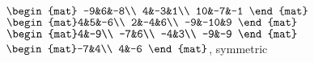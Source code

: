 \begin{Answer}
\Question $\begin{mat} -9&6&-8\\  4&-3&1\\  10&-7&-1 \end{mat}$
\Question $\begin{mat}4&5&-6\\  2&-4&6\\  -9&-10&9 \end{mat}$
\Question $\begin{mat}4&-9\\  -7&6\\  -4&3\\  -9&-9 \end{mat}$
\Question $\begin{mat}-7&4\\  4&-6 \end{mat}$, symmetric

\end{Answer}
